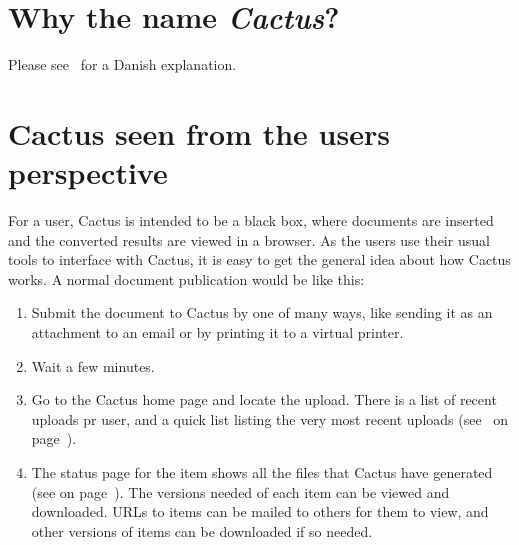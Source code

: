 \section{Why the name \textit{Cactus}?}

Please see~ for a Danish explanation.



\section{Cactus seen from the users perspective}
\label{sec:cactus-seen-from-the-users-perspective}






  
For a user, Cactus is intended to be a black box, where documents
 are inserted and the converted results are viewed in a browser.  As
 the users use their usual tools to interface with Cactus, it is easy
 to get the general idea about how Cactus works. A normal document
 publication would be like this:


\begin{enumerate}
\item Submit the document to Cactus by one of many ways,
  like sending it as an attachment to an email or by
  printing it to a virtual printer.

\item Wait a few minutes.

\item Go to the Cactus home page and locate the upload.  There is a
  list of recent uploads pr user, and a quick list listing the very
  most recent uploads (see~ on
  page~\pageref{fig:cactus-ten-most-recent}).

\item The status page for the item shows all the files that Cactus
  have generated (see  on
  page~\pageref{fig:cactus-splitted-email-from-lars}).  The versions
  needed of each item can be viewed and downloaded.  URLs to items can
  be mailed to others for them to view, and other versions of items
  can be downloaded if so needed.
\end{enumerate}

